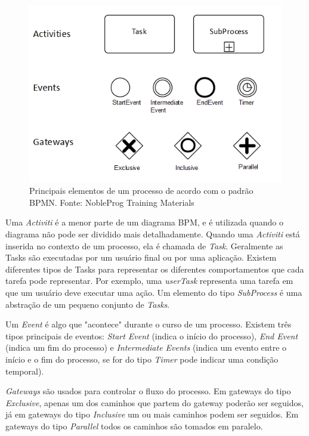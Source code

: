 \documentclass[12pt]{article}
\begin{document}
\begin{figure}[ht]
\centering
\includegraphics[width=.9\textwidth]{figuras/bpmn.png}
\caption{Principais elementos de um processo de acordo com o padrão BPMN. Fonte: NobleProg Training Materials}
\label{fig:bpmn}
\end{figure}

Uma \emph{Activiti} é a menor parte de um diagrama BPM, e é utilizada quando o diagrama não pode ser dividido mais detalhadamente. Quando uma \emph{Activiti} está inserida no contexto de um processo, ela é chamada de \emph{Task}. Geralmente as Tasks são executadas por um usuário final ou por uma aplicação. Existem diferentes tipos de Tasks para representar os diferentes comportamentos que cada tarefa pode representar. Por exemplo, uma \emph{userTask} representa uma tarefa em que um usuário deve executar uma ação. Um elemento do tipo \emph{SubProcess} é uma abstração de um pequeno conjunto de \emph{Tasks}.

Um \emph{Event} é algo que "acontece" durante o curso de um processo\cite{model2011notation}. Existem três tipos principais de eventos: \emph{Start Event} (indica o início do processo), \emph{End Event} (indica um fim do processo) e \emph{Intermediate Events} (indica um evento entre o início e o fim do processo, se for do tipo \emph{Timer} pode indicar uma condição temporal).

\emph{Gateways} são usados para controlar o fluxo do processo. Em gateways do tipo \emph{Exclusive}, apenas um dos caminhos que partem do gateway poderão ser seguidos, já em gateways do tipo \emph{Inclusive} um ou mais caminhos podem ser seguidos. Em gateways do tipo \emph{Parallel} todos os caminhos são tomados em paralelo.
\end{document}
